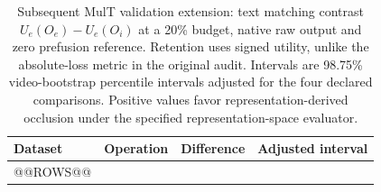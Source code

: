 \begin{table}[!htbp]
\centering\small
\caption{Subsequent MulT validation extension: text matching contrast $U_e(O_e)-U_e(O_i)$ at a 20\% budget, native raw output and zero prefusion reference. Retention uses signed utility, unlike the absolute-loss metric in the original audit. Intervals are 98.75\% video-bootstrap percentile intervals adjusted for the four declared comparisons. Positive values favor representation-derived occlusion under the specified representation-space evaluator.}\label{tab:mult-extension}
\begin{tabular}{llrr}
\toprule Dataset & Operation & Difference & Adjusted interval\\
\midrule
@@ROWS@@
\bottomrule
\end{tabular}
\end{table}
